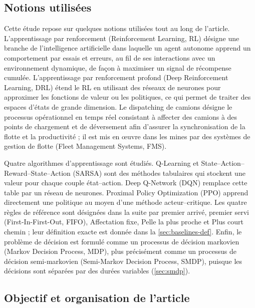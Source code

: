 \documentclass[11pt,a4paper]{article}
\newif\ifrevmarks
\newcommand{\revtag}[1]{\ifrevmarks\textsuperscript{\textcolor{red!70!black}{\scriptsize[#1]}}\fi}
\newenvironment{revbloc}[1]{\par\ifrevmarks\color{revcolor}\noindent\revtag{#1}\ \fi}{\par}
\begin{document}
\subsection{Notions utilisées}

\begin{revbloc}{m3, m4}
Cette étude repose sur quelques notions utilisées tout au long de l'article. L'apprentissage par renforcement (Reinforcement Learning, RL) désigne une branche de l'intelligence artificielle dans laquelle un agent autonome apprend un comportement par essais et erreurs, au fil de ses interactions avec un environnement dynamique, de façon à maximiser un signal de récompense cumulée. L'apprentissage par renforcement profond (Deep Reinforcement Learning, DRL) étend le RL en utilisant des réseaux de neurones pour approximer les fonctions de valeur ou les politiques, ce qui permet de traiter des espaces d'états de grande dimension. Le dispatching de camions désigne le processus opérationnel en temps réel consistant à affecter des camions à des points de chargement et de déversement afin d'assurer la synchronisation de la flotte et la productivité ; il est mis en œuvre dans les mines par des systèmes de gestion de flotte (Fleet Management Systems, FMS).

Quatre algorithmes d'apprentissage sont étudiés. Q-Learning et State--Action--Reward--State--Action (SARSA) sont des méthodes tabulaires qui stockent une valeur pour chaque couple état--action. Deep Q-Network (DQN) remplace cette table par un réseau de neurones. Proximal Policy Optimization (PPO) apprend directement une politique au moyen d'une méthode acteur--critique. Les quatre règles de référence sont désignées dans la suite par premier arrivé, premier servi (First-In-First-Out, FIFO), Affectation fixe, Pelle la plus proche et Plus court chemin ; leur définition exacte est donnée dans la \cref{sec:baselines-def}. Enfin, le problème de décision est formulé comme un processus de décision markovien (Markov Decision Process, MDP), plus précisément comme un processus de décision semi-markovien (Semi-Markov Decision Process, SMDP), puisque les décisions sont séparées par des durées variables (\cref{sec:smdp}).
\end{revbloc}

\subsection{Objectif et organisation de l'article}
\end{document}
